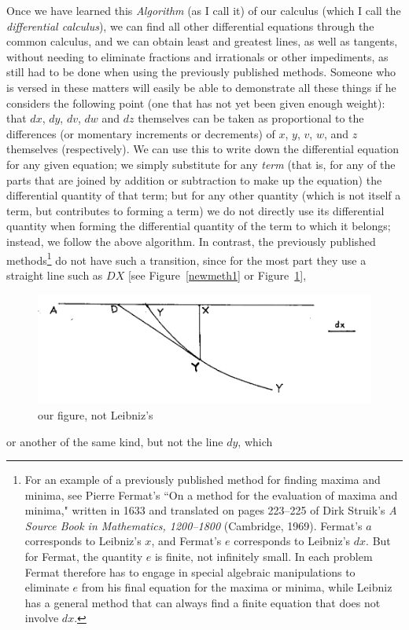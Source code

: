 \documentclass[twoside,openright]{article}
\begin{document}
Once we have learned this {\em Algorithm} (as I call it) of our
calculus (which I call the {\em differential calculus}), we can find
all other differential equations through the common calculus, and we
can obtain least and greatest lines, as well as tangents, without
needing to eliminate fractions and irrationals or other impediments,
as still had to be done when using the previously published methods.
Someone who is versed in these matters will easily be able to
demonstrate all these things if he considers the following point (one
that has not yet been given enough weight): that $dx$, $dy$, $dv$,
$dw$ and $dz$ themselves can be taken as proportional to the
differences (or momentary increments or decrements) of $x$, $y$, $v$,
$w$, and $z$ themselves (respectively).  We can use this to write down
the differential equation \label{nmdiffeq} for any given equation; we
simply substitute for any {\em term} (that is, for any of the parts
that are joined by addition or subtraction to make up the equation)
the differential quantity of that term; but for any other quantity
(which is not itself a term, but contributes to forming a term) we do
not directly use its differential quantity when forming the
differential quantity of the term to which it belongs; instead, we
follow the above algorithm. In
contrast, the previously published methods\footnote{For an example of
  a previously published method for finding maxima and minima, see
  Pierre Fermat's ``On a method for the evaluation of maxima and
  minima," written in 1633 and translated on pages 223--225 of Dirk
  Struik's {\em A Source Book in Mathematics, 1200--1800} (Cambridge,
  1969). Fermat's $a$ corresponds to Leibniz's $x$, and Fermat's $e$
  corresponds to Leibniz's $dx$.  But for Fermat, the quantity $e$ is
  finite, not infinitely small.  In each problem Fermat therefore has
  to engage in special algebraic manipulations to eliminate $e$ from
  his final equation for the maxima or minima, while Leibniz has a
  general method that can always find a finite equation that does not
  involve $dx$. } do not have such a transition, since for the most
part they use a straight line such as $DX$ [see Figure~\ref{newmeth1}
or Figure~\ref{tanandord}],
\begin{figure}[htp]
  \begin{center}
    \includegraphics[width=.75\textwidth]{fig/Figure19}
    \caption{our figure, not Leibniz's}
    \label{tanandord}
  \end{center}
\end{figure} or another of the same kind, but not the line $dy$, which
\end{document}
